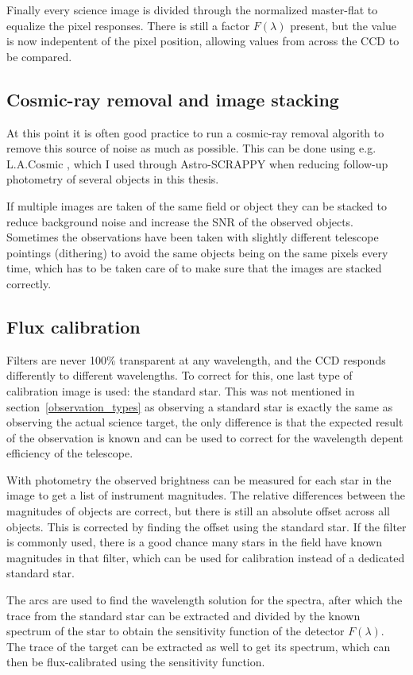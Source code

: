 \documentclass[a4paper,oneside,12pt, class=Latex/Classes/PhDthesisPSnPDF, crop=false]{standalone}
\begin{document}
Finally every science image is divided through the normalized master-flat to equalize the pixel responses. There is still a factor $F(\lambda)$ present, but the value is now indepentent of the pixel position, allowing values from across the CCD to be compared.

\subsection{Cosmic-ray removal and image stacking}
At this point it is often good practice to run a cosmic-ray removal algorith to remove this source of noise as much as possible. This can be done using e.g. L.A.Cosmic \citep{lacosmic}, which I used through Astro-SCRAPPY \citep{astroSCRAPPY} when reducing follow-up photometry of several objects in this thesis.

If multiple images are taken of the same field or object they can be stacked to reduce background noise and increase the SNR of the observed objects. Sometimes the observations have been taken with slightly different telescope pointings (dithering) to avoid the same objects being on the same pixels every time, which has to be taken care of to make sure that the images are stacked correctly.

\subsection{Flux calibration}
Filters are never 100\% transparent at any wavelength, and the CCD responds differently to different wavelengths. To correct for this, one last type of calibration image is used: the standard star. This was not mentioned in section~\ref{observation_types} as observing a standard star is exactly the same as observing the actual science target, the only difference is that the expected result of the observation is known and can be used to correct for the wavelength depent efficiency of the telescope.

With photometry the observed brightness can be measured for each star in the image to get a list of instrument magnitudes. The relative differences between the magnitudes of objects are correct, but there is still an absolute offset across all objects. This is corrected by finding the offset using the standard star. If the filter is commonly used, there is a good chance many stars in the field have known magnitudes in that filter, which can be used for calibration instead of a dedicated standard star.

The arcs are used to find the wavelength solution for the spectra, after which the trace from the standard star can be extracted and divided by the known spectrum of the star to obtain the sensitivity function of the detector $F(\lambda)$. The trace of the target can be extracted as well to get its spectrum, which can then be flux-calibrated using the sensitivity function.
\end{document}
